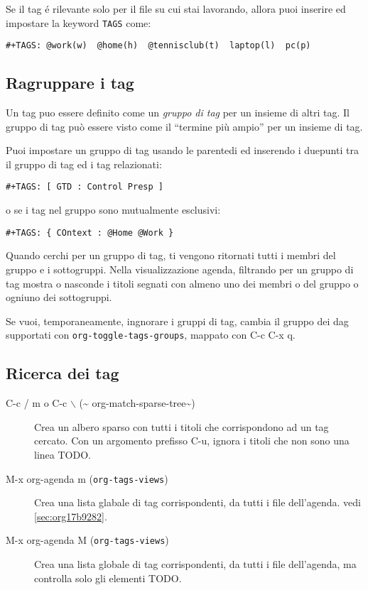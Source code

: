 \documentclass[11pt]{article}
\begin{document}
Se il tag é rilevante solo per il file su cui stai lavorando, allora
puoi inserire ed impostare la keyword \texttt{TAGS} come:

\begin{verbatim}
#+TAGS: @work(w)  @home(h)  @tennisclub(t)  laptop(l)  pc(p)
\end{verbatim}

\subsection*{Ragruppare i tag}
\label{sec:orgc7ee942}
Un tag puo essere definito come un \emph{gruppo di tag} per un insieme di
altri tag. Il gruppo di tag può essere visto come il ``termine più
ampio'' per un insieme di tag.

Puoi impostare un gruppo di tag usando le parentedi ed inserendo i
duepunti tra il gruppo di tag ed i tag relazionati:

\begin{verbatim}
#+TAGS: [ GTD : Control Presp ]
\end{verbatim}


o se i tag nel gruppo sono mutualmente esclusivi:

\begin{verbatim}
#+TAGS: { COntext : @Home @Work }
\end{verbatim}


Quando cerchi per un gruppo di tag, ti vengono ritornati tutti i membri del gruppo e i
sottogruppi. Nella visualizzazione agenda, filtrando per un gruppo di tag mostra o nasconde i titoli
segnati con almeno uno dei membri o del gruppo o ogniuno dei sottogruppi.

Se vuoi, temporaneamente, ingnorare i gruppi di tag, cambia il gruppo
dei dag supportati con \texttt{org-toggle-tags-groups}, mappato con
C-c C-x q.

\subsection*{Ricerca dei tag}
\label{sec:org156e7ff}
\begin{description}
\item[{C-c / m o C-c $\backslash$ (\textasciitilde{} org-match-sparse-tree\textasciitilde{})}] Crea un albero sparso con tutti i titoli che corrispondono ad un tag
cercato. Con un argomento prefisso C-u, ignora i titoli
che non sono una linea TODO.

\item[{M-x org-agenda m (\texttt{org-tags-views})}] Crea una lista glabale di tag corrispondenti, da tutti i file
dell'agenda. vedi \ref{sec:org17b9282}.

\item[{M-x org-agenda M (\texttt{org-tags-views})}] Crea una lista globale di tag corrispondenti, da tutti i file
dell'agenda, ma controlla solo gli elementi TODO.
\end{description}
\end{document}
